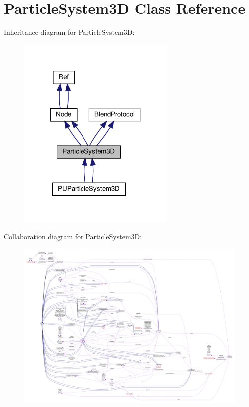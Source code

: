 \hypertarget{classParticleSystem3D}{}\section{Particle\+System3D Class Reference}
\label{classParticleSystem3D}


Inheritance diagram for Particle\+System3D\+:
\nopagebreak
\begin{figure}[H]
\begin{center}
\leavevmode
\includegraphics[width=216pt]{classParticleSystem3D__inherit__graph}
\end{center}
\end{figure}


Collaboration diagram for Particle\+System3D\+:
\nopagebreak
\begin{figure}[H]
\begin{center}
\leavevmode
\includegraphics[width=350pt]{classParticleSystem3D__coll__graph}
\end{center}
\end{figure}

